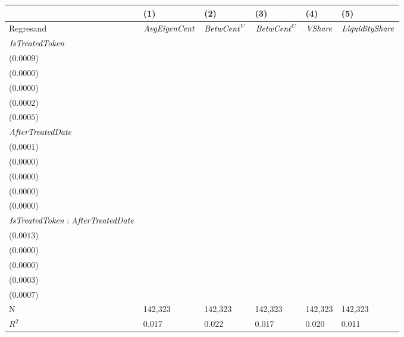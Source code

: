 \begin{tabular}{llllll}
\toprule
{} &                                      (1) &                                      (2) &                                      (3) &                                      (4) &                                      (5) \\
\midrule
Regresand                                     &                     ${\it AvgEigenCent}$ &                       ${\it BetwCent}^V$ &                       ${\it BetwCent}^C$ &                           ${\it VShare}$ &                   ${\it LiquidityShare}$ \\
${\it IsTreatedToken}$                        &  \makecell{$0.0125^{***}$ \\ ($0.0009$)} &  \makecell{$0.0003^{***}$ \\ ($0.0000$)} &  \makecell{$0.0001^{***}$ \\ ($0.0000$)} &  \makecell{$0.0035^{***}$ \\ ($0.0002$)} &  \makecell{$0.0087^{***}$ \\ ($0.0005$)} \\
${\it AfterTreatedDate}$                      &  \makecell{$0.0023^{***}$ \\ ($0.0001$)} &  \makecell{$0.0000^{***}$ \\ ($0.0000$)} &  \makecell{$0.0000^{***}$ \\ ($0.0000$)} &  \makecell{$0.0006^{***}$ \\ ($0.0000$)} &  \makecell{$0.0009^{***}$ \\ ($0.0000$)} \\
${\it IsTreatedToken}:{\it AfterTreatedDate}$ &  \makecell{$0.0057^{***}$ \\ ($0.0013$)} &  \makecell{$0.0000^{***}$ \\ ($0.0000$)} &     \makecell{$0.0000^{}$ \\ ($0.0000$)} &  \makecell{$0.0014^{***}$ \\ ($0.0003$)} &  \makecell{$-0.0016^{**}$ \\ ($0.0007$)} \\
\midrule N                                    &                                  142,323 &                                  142,323 &                                  142,323 &                                  142,323 &                                  142,323 \\
$R^2$                                         &                                    0.017 &                                    0.022 &                                    0.017 &                                    0.020 &                                    0.011 \\
\bottomrule
\end{tabular}
